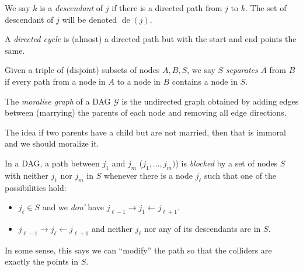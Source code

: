 \documentclass[a4paper]{article}
\DeclareMathOperator\de{de}
\begin{document}
\begin{defi}[Descendent]
  We say $k$ is a \emph{descendant} of $j$ if there is a directed path from $j$ to $k$. The set of descendant of $j$ will be denoted $\de(j)$.
\end{defi}

\begin{defi}
  A \emph{directed cycle} is (almost) a directed path but with the start and end points the same.
\end{defi}

\begin{defi}
\end{defi}

\begin{defi}
\end{defi}

\begin{defi}[Separates]
  Given a triple of (disjoint) subsets of nodes $A, B, S$, we say $S$ \emph{separates} $A$ from $B$ if every path from a node in $A$ to a node in $B$ contains a node in $S$.
\end{defi}

\begin{defi}
  The \emph{moralise graph} of a DAG $\mathcal{G}$ is the undirected graph obtained by adding edges between (marrying) the parents of each node and removing all edge directions.
\end{defi}
The idea if two parents have a child but are not married, then that is immoral and we should moralize it.

\begin{defi}[Blocked]
  In a DAG, a path between $j_1$ and $j_m$ ($j_1, \ldots, j_m)$) is \emph{blocked} by a set of nodes $S$ with neither $j_1$ nor $j_m$ in $S$ whenever there is a node $j_\ell$ such that one of the possibilities hold:
  \begin{itemize}
    \item $j_\ell \in S$ and we \emph{don'} have $j_{\ell - 1} \to j_1 \leftarrow j_{\ell + 1}$.
    \item $j_{\ell - 1} \to j_{\ell} \leftarrow j_{\ell + 1}$ and neither $j_\ell$ nor any of its descendants are in $S$.
  \end{itemize}
\end{defi}
In some sense, this says we can ``modify'' the path so that the colliders are exactly the points in $S$.
\end{document}
